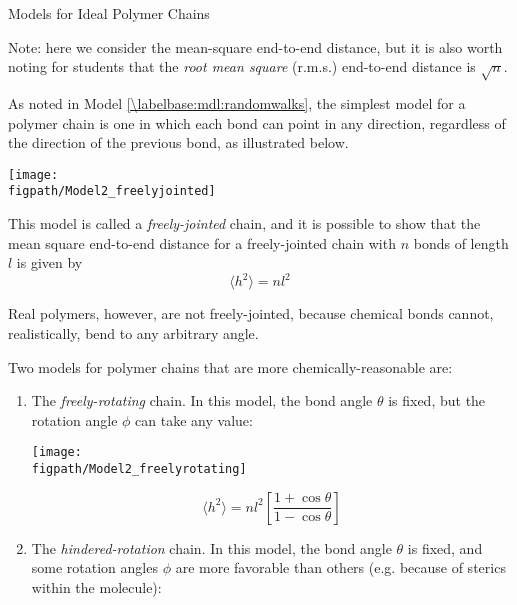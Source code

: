 \begin{activity}{Models for Ideal Polymer Chains}
\begin{ctqs}
\begin{enumerate}
\begin{solution}[1.5in]
					Note: here we consider the mean-square end-to-end distance, but it is also worth noting for students that the \emph{root mean square} (r.m.s.) end-to-end distance is $\sqrt{n}$.
				
				\end{solution}
		\end{enumerate}
		

\end{ctqs}

\begin{model}
\label{\labelbase:mdl:chainmodels}

	As noted in Model \ref{\labelbase:mdl:randomwalks}, the simplest model for a polymer chain is one in which each bond can point in any direction, regardless of the direction of the previous bond, as illustrated below.
	
		\centerline{\texttt{[image: \\figpath/Model2\_freelyjointed]}}
	
	This model is called a \emph{freely-jointed} chain, and it is possible to show that the mean square end-to-end distance for a freely-jointed chain with $n$ bonds of length $l$ is given by
	\begin{equation*}
		\langle h^2\rangle =nl^2
	\end{equation*}
	
	Real polymers, however, are not freely-jointed, because chemical bonds cannot, realistically, bend to any arbitrary angle.
	
	Two models for polymer chains that are more chemically-reasonable are:
	
	\begin{enumerate}
		\item The \emph{freely-rotating} chain.  In this model, the bond angle $\theta$ is fixed, but the rotation angle $\phi$ can take any value:
		
			\begin{minipage}[c]{0.45\textwidth}
				\centerline{\texttt{[image: \\figpath/Model2\_freelyrotating]}}
			\end{minipage}\begin{minipage}[c]{0.45\textwidth}
				\begin{equation*}
					\langle h^2\rangle = n l^2 \left[\frac{1+\cos\theta}{1-\cos\theta}\right]
				\end{equation*}
			\end{minipage}
		
		\item The \emph{hindered-rotation} chain.  In this model, the bond angle $\theta$ is fixed, and some rotation angles $\phi$ are more favorable than others (e.g. because of sterics within the molecule):
		

\end{enumerate}
\end{model}
\end{activity}
